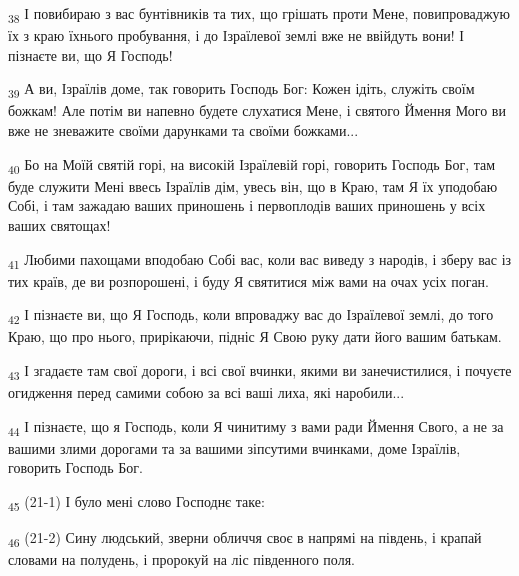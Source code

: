\begin{tcolorbox}
\textsubscript{38} І повибираю з вас бунтівників та тих, що грішать проти Мене, повипроваджую їх з краю їхнього пробування, і до Ізраїлевої землі вже не ввійдуть вони! І пізнаєте ви, що Я Господь!
\end{tcolorbox}
\begin{tcolorbox}
\textsubscript{39} А ви, Ізраїлів доме, так говорить Господь Бог: Кожен ідіть, служіть своїм божкам! Але потім ви напевно будете слухатися Мене, і святого Ймення Мого ви вже не зневажите своїми дарунками та своїми божками...
\end{tcolorbox}
\begin{tcolorbox}
\textsubscript{40} Бо на Моїй святій горі, на високій Ізраїлевій горі, говорить Господь Бог, там буде служити Мені ввесь Ізраїлів дім, увесь він, що в Краю, там Я їх уподобаю Собі, і там зажадаю ваших приношень і первоплодів ваших приношень у всіх ваших святощах!
\end{tcolorbox}
\begin{tcolorbox}
\textsubscript{41} Любими пахощами вподобаю Собі вас, коли вас виведу з народів, і зберу вас із тих країв, де ви розпорошені, і буду Я святитися між вами на очах усіх поган.
\end{tcolorbox}
\begin{tcolorbox}
\textsubscript{42} І пізнаєте ви, що Я Господь, коли впроваджу вас до Ізраїлевої землі, до того Краю, що про нього, прирікаючи, підніс Я Свою руку дати його вашим батькам.
\end{tcolorbox}
\begin{tcolorbox}
\textsubscript{43} І згадаєте там свої дороги, і всі свої вчинки, якими ви занечистилися, і почуєте огидження перед самими собою за всі ваші лиха, які наробили...
\end{tcolorbox}
\begin{tcolorbox}
\textsubscript{44} І пізнаєте, що я Господь, коли Я чинитиму з вами ради Ймення Свого, а не за вашими злими дорогами та за вашими зіпсутими вчинками, доме Ізраїлів, говорить Господь Бог.
\end{tcolorbox}
\begin{tcolorbox}
\textsubscript{45} (21-1) І було мені слово Господнє таке:
\end{tcolorbox}
\begin{tcolorbox}
\textsubscript{46} (21-2) Сину людський, зверни обличчя своє в напрямі на південь, і крапай словами на полудень, і пророкуй на ліс південного поля.
\end{tcolorbox}
